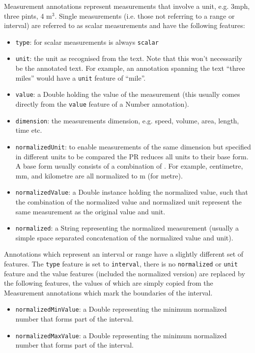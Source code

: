 Measurement annotations represent measurements that involve a unit, e.g. 3mph,
three pints, 4 m$^3$. Single measurements (i.e. those not referring to a range
or interval) are referred to as scalar measurements and have the following
features:
\begin{itemize}
\item \texttt{type}: for scalar measurements is always \texttt{scalar}
\item \texttt{unit}: the unit as recognised from the text. Note that this won't
  necessarily be the annotated text. For example, an annotation spanning the
 text ``three miles'' would have a \texttt{unit} feature of ``mile''.
\item \texttt{value}: a Double holding the value of the measurement (this
  usually comes directly from the \texttt{value} feature of a Number
 annotation).
\item \texttt{dimension}: the measurements dimension, e.g. speed, volume, area,
  length, time etc. 
\item \texttt{normalizedUnit}: to enable measurements of the same dimension but
  specified in different units to be compared the PR reduces all units to their
  base form. A base form usually consists of a combination of
  .
  For example, centimetre, mm, and kilometre are all normalized to m (for
  metre).
\item \texttt{normalizedValue}: a Double instance holding the normalized value,
  such that the combination of the normalized value and normalized unit
  represent the same measurement as the original value and unit. 
\item \texttt{normalized}: a String representing the normalized measurement
  (usually a simple space separated concatenation of the normalized value and
  unit).
\end{itemize}

Annotations which represent an interval or range have a slightly different set
of features. The \texttt{type} feature is set to \texttt{interval}, there is no
\texttt{normalized} or \texttt{unit} feature and the value features (included
the normalized version) are replaced by the following features, the values of
which are simply copied from the Measurement annotations which mark the
boundaries of the interval.

\begin{itemize}
\item \texttt{normalizedMinValue}: a Double representing the minimum normalized
  number that forms part of the interval. 
\item \texttt{normalizedMaxValue}: a Double representing the minimum normalized
  number that forms part of the interval.
\end{itemize}

